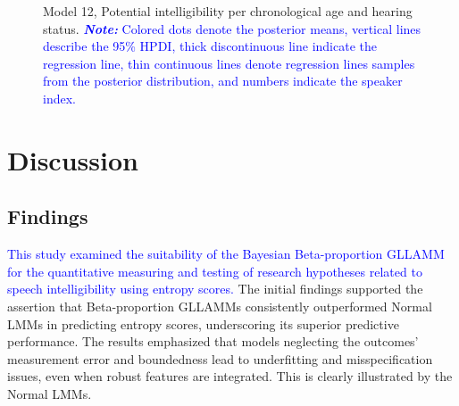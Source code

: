 \documentclass[
  authoryear,
  preprint,
  1p]{elsarticle}
\begin{document}
\label{cell-fig-rq3-intelligibility-model12}
\begin{figure}[H]


\caption{\label{fig-rq3-intelligibility-model12}Model 12, Potential
intelligibility per chronological age and hearing status.
\textcolor{blue}{\textbf{\emph{Note:}} Colored dots denote the posterior means, vertical
lines describe the 95\% HPDI, thick discontinuous line indicate the
regression line, thin continuous lines denote regression lines samples
from the posterior distribution, and numbers indicate the speaker
index.}}

\end{figure}%

\section{Discussion}\label{sec-discussion}

\subsection{Findings}\label{sec-D-F}

\textcolor{blue}{This study examined the suitability of the Bayesian Beta-proportion
GLLAMM for the quantitative measuring and testing of research hypotheses
related to speech intelligibility using entropy scores.} The initial
findings supported the assertion that Beta-proportion GLLAMMs
consistently outperformed Normal LMMs in predicting entropy scores,
underscoring its superior predictive performance. The results emphasized
that models neglecting the outcomes' measurement error and boundedness
lead to underfitting and misspecification issues, even when robust
features are integrated. This is clearly illustrated by the Normal LMMs.
\end{document}
